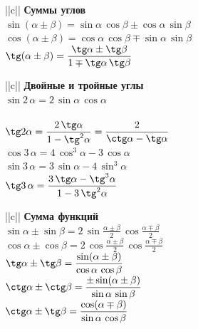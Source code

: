 \begin{tabu}[t]{||c||}
	\hline
		\textbf{Суммы углов} \\
	\hline
	\hline
		$\displaystyle \sin(\alpha\pm \beta) = \sin \alpha\, \cos \beta \pm \cos \alpha\, \sin \beta $ \\
	\hline
		$\displaystyle \cos(\alpha\pm \beta) = \cos \alpha\, \cos \beta \mp \sin \alpha\, \sin \beta $ \\
	\hline
		$\displaystyle \tg (\alpha \pm \beta) = \frac{\tg \alpha \pm \tg \beta}{1 \mp \tg \alpha \, \tg \beta} $ \\
	\hline
\end{tabu}
\begin{tabu}[t]{||c||}
	\hline
		\textbf{Двойные и тройные углы} \\
	\hline
	\hline
		$ \sin 2\, \alpha = 2\, \sin \alpha\, \cos \alpha $ \\
	\hline
		 \\
	\hline
		$\displaystyle \tg 2\alpha = \frac{2\, \tg \alpha}{1 - \tg^2 \alpha} = \frac{2}{\ctg \alpha - \tg \alpha} $ \\
	\hline
		$\displaystyle \cos 3\, \alpha = 4\, \cos^3 \alpha - 3\, \cos \alpha $ \\
	\hline
		$\displaystyle \sin 3\, \alpha = 3\, \sin \alpha - 4\, \sin^3 \alpha $ \\
	\hline
		$\displaystyle \tg 3\, \alpha = \frac{3\, \tg \alpha - \tg^3 \alpha}{1 - 3\, \tg^2 \alpha} $ \\
	\hline
\end{tabu}
\begin{tabu}[t]{||c||}
	\hline
		\textbf{Сумма функций} \\
	\hline
	\hline
		$\displaystyle \sin \alpha \pm \sin \beta = 2\, \sin \frac{\alpha \pm \beta}{2}\, \cos \frac{\alpha \mp \beta}{2} $ \\
	\hline
		$\displaystyle \cos \alpha \pm \cos \beta = 2\, \cos \frac{\alpha \pm \beta}{2}\, \cos \frac{\alpha \mp \beta}{2} $ \\
	\hline
		$\displaystyle \tg \alpha \pm \tg \beta = \frac{\sin (\alpha \pm \beta)}{\cos \alpha\, \cos \beta} $ \\
	\hline
		$\displaystyle \ctg \alpha \pm \ctg \beta = \frac{\pm\sin (\alpha \pm \beta)}{\sin \alpha\, \sin \beta} $ \\
	\hline
		$\displaystyle \ctg \alpha \pm \tg \beta = \frac{\cos (\alpha \mp \beta)}{\sin \alpha\, \cos \beta} $ \\
	\hline
		 \\
	\hline
		 \\
	\hline
\end{tabu}

